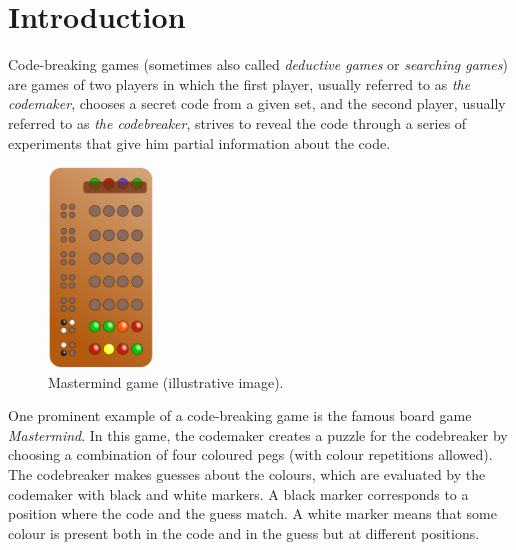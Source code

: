  \chapter{Introduction}


Code-breaking games (sometimes also called \emph{deductive games} or \emph{searching games})
  are games of two players in which the first player,
  usually referred to as \emph{the codemaker},
    chooses a secret code from a given set, and the second player,
  usually referred to as \emph{the codebreaker},
    strives to reveal the code through a series
    of experiments that give him partial information about the code.

\begin{figure}
  \vspace{-5mm}
  \begin{center}
  \includegraphics[width=0.25\textwidth]{pictures/mastermind.png}
  \vspace{-5mm}
  \end{center}
  \caption{Mastermind game (illustrative image)\protect\footnotemark.}
  \vspace{-5mm}
\end{figure}

One prominent example of a code-breaking game is the famous board game
  \emph{Mastermind}.
In this game, the codemaker creates a puzzle for the codebreaker by choosing a
  combination of four coloured pegs (with colour repetitions allowed).
The codebreaker makes guesses about the colours, which are evaluated by the codemaker with
  black and white markers.
A black marker corresponds to a position where the code and the guess match.
A white marker means that some colour is present both in the code
  and in the guess but at different positions.

